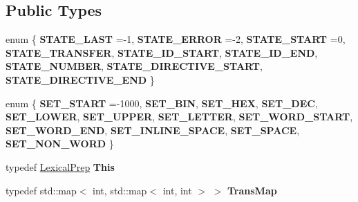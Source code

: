 \subsection*{Public Types}
\begin{DoxyCompactItemize}
\item 
\mbox{\label{classx2_1_1_lexical_prep_a824c45c7a34058d731b60324815a8384}} 
enum \{ \newline
{\bfseries S\+T\+A\+T\+E\+\_\+\+L\+A\+ST} =-\/1, 
{\bfseries S\+T\+A\+T\+E\+\_\+\+E\+R\+R\+OR} =-\/2, 
{\bfseries S\+T\+A\+T\+E\+\_\+\+S\+T\+A\+RT} =0, 
{\bfseries S\+T\+A\+T\+E\+\_\+\+T\+R\+A\+N\+S\+F\+ER}, 
\newline
{\bfseries S\+T\+A\+T\+E\+\_\+\+I\+D\+\_\+\+S\+T\+A\+RT}, 
{\bfseries S\+T\+A\+T\+E\+\_\+\+I\+D\+\_\+\+E\+ND}, 
{\bfseries S\+T\+A\+T\+E\+\_\+\+N\+U\+M\+B\+ER}, 
{\bfseries S\+T\+A\+T\+E\+\_\+\+D\+I\+R\+E\+C\+T\+I\+V\+E\+\_\+\+S\+T\+A\+RT}, 
\newline
{\bfseries S\+T\+A\+T\+E\+\_\+\+D\+I\+R\+E\+C\+T\+I\+V\+E\+\_\+\+E\+ND}
 \}
\item 
\mbox{\label{classx2_1_1_lexical_prep_a2d842e29a3f190c8e8aab0158e2f2d8d}} 
enum \{ \newline
{\bfseries S\+E\+T\+\_\+\+S\+T\+A\+RT} =-\/1000, 
{\bfseries S\+E\+T\+\_\+\+B\+IN}, 
{\bfseries S\+E\+T\+\_\+\+H\+EX}, 
{\bfseries S\+E\+T\+\_\+\+D\+EC}, 
\newline
{\bfseries S\+E\+T\+\_\+\+L\+O\+W\+ER}, 
{\bfseries S\+E\+T\+\_\+\+U\+P\+P\+ER}, 
{\bfseries S\+E\+T\+\_\+\+L\+E\+T\+T\+ER}, 
{\bfseries S\+E\+T\+\_\+\+W\+O\+R\+D\+\_\+\+S\+T\+A\+RT}, 
\newline
{\bfseries S\+E\+T\+\_\+\+W\+O\+R\+D\+\_\+\+E\+ND}, 
{\bfseries S\+E\+T\+\_\+\+I\+N\+L\+I\+N\+E\+\_\+\+S\+P\+A\+CE}, 
{\bfseries S\+E\+T\+\_\+\+S\+P\+A\+CE}, 
{\bfseries S\+E\+T\+\_\+\+N\+O\+N\+\_\+\+W\+O\+RD}
 \}
\item 
\mbox{\label{classx2_1_1_lexical_prep_a85dac42b31f4e252c5bd41225ddc8192}} 
typedef \hyperlink{classx2_1_1_lexical_prep}{Lexical\+Prep} {\bfseries This}
\item 
\mbox{\label{classx2_1_1_lexical_prep_a5dfa1a4f6a396958da74affec6c1df67}} 
typedef std\+::map$<$ int, std\+::map$<$ int, int $>$ $>$ {\bfseries Trans\+Map}
\end{DoxyCompactItemize}
